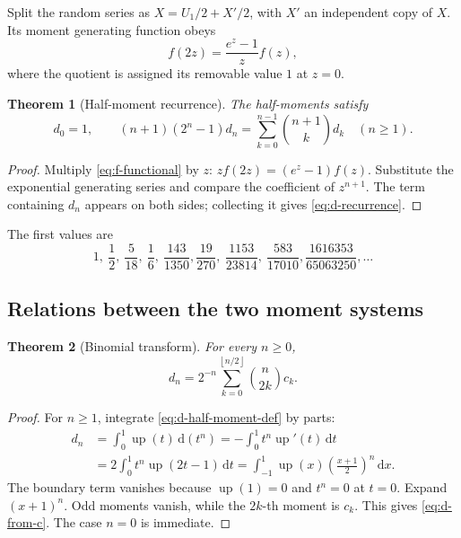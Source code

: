 \documentclass[11pt,oneside]{article}
\newtheorem{theorem}{Theorem}[section]
\theoremstyle{definition}
\theoremstyle{remark}
\newcommand{\upf}{\operatorname{up}}
\newcommand{\dd}{\,\mathrm d}
\newcommand{\floor}[1]{\left\lfloor#1\right\rfloor}
\begin{document}
Split the random series as $X=U_1/2+X'/2$, with $X'$ an independent copy of $X$.
Its moment generating function obeys
\begin{equation}\label{eq:f-functional}
  f(2z)=\frac{e^z-1}{z}f(z),
\end{equation}
where the quotient is assigned its removable value $1$ at $z=0$.

\begin{theorem}[Half-moment recurrence]\label{thm:d-recurrence}
The half-moments satisfy
\begin{equation}\label{eq:d-recurrence}
  d_0=1,
  \qquad
  (n+1)(2^n-1)d_n
  =\sum_{k=0}^{n-1}\binom{n+1}{k}d_k
  \quad(n\ge1).
\end{equation}
\end{theorem}

\begin{proof}
Multiply \eqref{eq:f-functional} by $z$:
$zf(2z)=(e^z-1)f(z)$.  Substitute the exponential generating series and compare
the coefficient of $z^{n+1}$.  The term containing $d_n$ appears on both sides;
collecting it gives \eqref{eq:d-recurrence}.
\end{proof}

The first values are
\begin{equation}\label{eq:first-d-values}
  1,\ \frac12,\ \frac5{18},\ \frac16,\ \frac{143}{1350},
  \frac{19}{270},\ \frac{1153}{23814},\ \frac{583}{17010},
  \frac{1616353}{65063250},\ldots
\end{equation}

\subsection{Relations between the two moment systems}

\begin{theorem}[Binomial transform]\label{thm:d-from-c}
For every $n\ge0$,
\begin{equation}\label{eq:d-from-c}
  d_n=2^{-n}\sum_{k=0}^{\floor{n/2}}\binom{n}{2k}c_k.
\end{equation}
\end{theorem}

\begin{proof}
For $n\ge1$, integrate \eqref{eq:d-half-moment-def} by parts:
\begin{align*}
 d_n
 &=\int_0^1\upf(t)\dd(t^n)
 =-\int_0^1t^n\upf'(t)\dd t\\
 &=2\int_0^1t^n\upf(2t-1)\dd t
 =\int_{-1}^1\upf(x)\left(\frac{x+1}{2}\right)^n\dd x.
\end{align*}
The boundary term vanishes because $\upf(1)=0$ and $t^n=0$ at $t=0$.
Expand $(x+1)^n$.  Odd moments vanish, while the $2k$-th moment is $c_k$.
This gives \eqref{eq:d-from-c}.  The case $n=0$ is immediate.
\end{proof}
\end{document}
